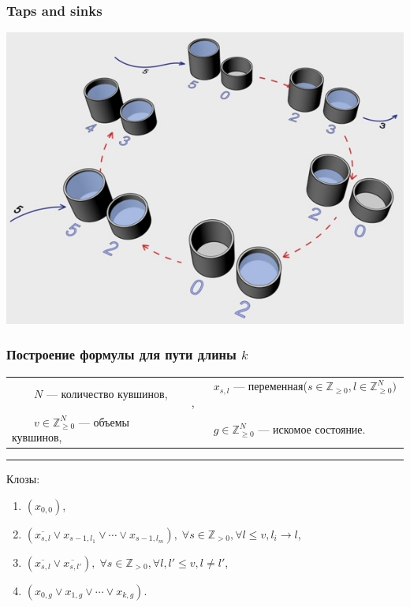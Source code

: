 \documentclass[14pt,aspectratio=169,hyperref={pdftex,unicode},xcolor=dvipsnames]{beamer}
\newcommand{\tabitem}{~~\llap{\textbullet}~~}
\begin{document}
\begin{frame}
\frametitle{Taps and sinks}
\begin{center}
\includegraphics[scale=0.39]{taps_and_sinks.jpg}
\end{center}

\end{frame}

\begin{frame}
\frametitle{Построение формулы для пути длины $k$}
  {\small
\begin{tabular}{ll}
  \tabitem $N$ ---  количество кувшинов, & \tabitem $x_{s, l}$ --- переменная($s \in \mathbb{Z}_{\geq 0}, l \in \mathbb{Z}^N_{\geq 0})$, \\
  \tabitem $v \in \mathbb{Z}^N_{\geq 0}$ --- объемы кувшинов, & \tabitem $g \in \mathbb{Z}^N_{\geq 0}$ --- искомое состояние.
\end{tabular}
  }
\vspace{3mm}
\hrule
\vspace{3mm}
Клозы:
\begin{enumerate}
  \item $(x_{0, 0})$,
  \item $(\overline{x_{s, l}} \vee x_{s - 1, l_1} \vee \dotsb \vee x_{s - 1, l_m}),\; \forall s \in \mathbb{Z}_{>0},\forall l \leq v, l_i \rightarrow l$,
  \item $(\overline{x_{s, l}} \vee \overline{x_{s, l'}}),\; \forall s \in \mathbb{Z}_{>0}, \forall l, l' \leq v, l \ne l'$,
  \item $(x_{0, g} \vee x_{1, g} \vee \dotsb \vee x_{k, g})$.
\end{enumerate}
\end{frame}
\end{document}
